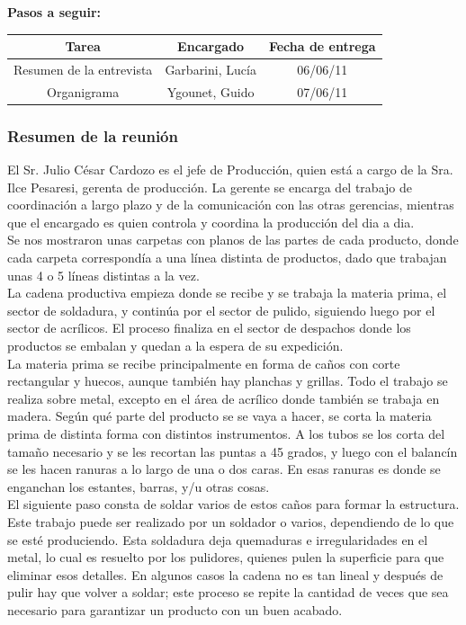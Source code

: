 \documentclass[a4paper,10pt,titlepage]{article}
\begin{document}
\vspace{10cm}
\textbf{Pasos a seguir:}\\
	    \begin{center}
	    \begin{tabular}{|c|c|c|}
		    \hline \textbf{Tarea} & \textbf{Encargado} & \textbf{Fecha de entrega} \\ 
		    \hline Resumen de la entrevista &  Garbarini, Luc\'ia & 06/06/11 \\ 
		    \hline Organigrama & Ygounet, Guido & 07/06/11 \\ 
		    \hline 
	    \end{tabular}
	    \end{center}

\newpage
\subsubsection*{Resumen de la reuni\'on}

El Sr. Julio C\'esar Cardozo es el jefe de Producción, quien est\'a a cargo de la Sra. Ilce Pesaresi, gerenta de producci\'on. 
La gerente se encarga del trabajo de coordinaci\'on a largo plazo y de la comunicación con las otras gerencias, mientras que el encargado es quien controla y 
coordina la producci\'on del dia a dia. \\
Se nos mostraron unas carpetas con planos de las partes de cada producto, donde cada carpeta correspond\'ia a una l\'inea distinta de productos, dado que trabajan unas 4 o 5 l\'ineas distintas a la vez.\\
La cadena productiva empieza donde se recibe y se trabaja la materia prima, el sector de soldadura, y contin\'ua por el sector de pulido, siguiendo luego
por el sector de acr\'ilicos. El proceso finaliza en el sector de despachos donde los productos se embalan y quedan a la espera de su expedici\'on.\\

La materia prima se recibe principalmente en forma de ca\~nos con corte rectangular y huecos, aunque tambi\'en hay planchas y grillas. 
Todo el trabajo se realiza sobre metal, excepto en el \'area de acr\'ilico donde tambi\'en se trabaja en madera.
Seg\'un qu\'e parte del producto se se vaya a hacer, se corta la materia prima de distinta forma con distintos instrumentos. 
A los tubos se los corta del tamaño necesario y se les recortan las puntas a 45 grados, y luego con el balanc\'in se les hacen ranuras a lo largo de una o dos caras.
En esas ranuras es donde se enganchan los estantes, barras, y/u otras cosas. \\
El siguiente paso consta de soldar varios de estos ca\~nos para formar la estructura. Este trabajo puede ser realizado por un soldador o varios, 
dependiendo de lo que se est\'e produciendo. Esta soldadura deja quemaduras e irregularidades en el metal, lo cual es resuelto por los pulidores, quienes pulen la superficie para que eliminar esos detalles. 
En algunos casos la cadena no es tan lineal y despu\'es de pulir hay que volver a soldar; este proceso se repite la cantidad de veces que sea necesario para garantizar un producto con un buen acabado.\\
\end{document}
